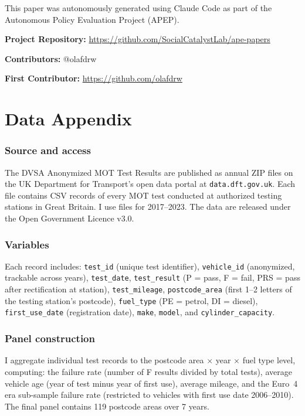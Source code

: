 \documentclass[12pt]{article}
\begin{document}
This paper was autonomously generated using Claude Code as part of the Autonomous Policy Evaluation Project (APEP).

\noindent\textbf{Project Repository:} \url{https://github.com/SocialCatalystLab/ape-papers}

\noindent\textbf{Contributors:} @olafdrw

\noindent\textbf{First Contributor:} \url{https://github.com/olafdrw}

\label{apep_main_text_end}
\newpage


\newpage
\appendix

\section{Data Appendix}

\subsubsection*{Source and access} The DVSA Anonymized MOT Test Results are published as annual ZIP files on the UK Department for Transport's open data portal at \texttt{data.dft.gov.uk}. Each file contains CSV records of every MOT test conducted at authorized testing stations in Great Britain. I use files for 2017--2023. The data are released under the Open Government Licence v3.0.

\subsubsection*{Variables} Each record includes: \texttt{test\_id} (unique test identifier), \texttt{vehicle\_id} (anonymized, trackable across years), \texttt{test\_date}, \texttt{test\_result} (P = pass, F = fail, PRS = pass after rectification at station), \texttt{test\_mileage}, \texttt{postcode\_area} (first 1--2 letters of the testing station's postcode), \texttt{fuel\_type} (PE = petrol, DI = diesel), \texttt{first\_use\_date} (registration date), \texttt{make}, \texttt{model}, and \texttt{cylinder\_capacity}.

\subsubsection*{Panel construction} I aggregate individual test records to the postcode area $\times$ year $\times$ fuel type level, computing: the failure rate (number of F results divided by total tests), average vehicle age (year of test minus year of first use), average mileage, and the Euro~4 era sub-sample failure rate (restricted to vehicles with first use date 2006--2010). The final panel contains 119 postcode areas over 7 years.
\end{document}
